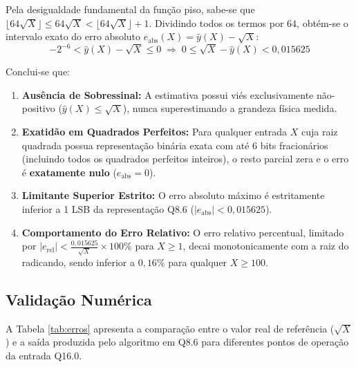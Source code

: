 \documentclass[conference]{IEEEtran}
\begin{document}
Pela desigualdade fundamental da função piso, sabe-se que $\lfloor 64\sqrt{X} \rfloor \le 64\sqrt{X} < \lfloor 64\sqrt{X} \rfloor + 1$. Dividindo todos os termos por $64$, obtém-se o intervalo exato do erro absoluto $e_{\text{abs}}(X) = \hat{y}(X) - \sqrt{X}$:
\begin{equation}
	-2^{-6} < \hat{y}(X) - \sqrt{X} \le 0 \;\Rightarrow\; 0 \le \sqrt{X} - \hat{y}(X) < 0{,}015625
	\label{eq:cota_erro}
\end{equation}

Conclui-se que:
\begin{enumerate}
	\item \textbf{Ausência de Sobressinal:} A estimativa possui viés exclusivamente não-positivo ($\hat{y}(X) \le \sqrt{X}$), nunca superestimando a grandeza física medida.
	\item \textbf{Exatidão em Quadrados Perfeitos:} Para qualquer entrada $X$ cuja raiz quadrada possua representação binária exata com até 6 bits fracionários (incluindo todos os quadrados perfeitos inteiros), o resto parcial zera e o erro é \textbf{exatamente nulo} ($e_{\text{abs}} = 0$).
	\item \textbf{Limitante Superior Estrito:} O erro absoluto máximo é estritamente inferior a 1 LSB da representação Q8.6 ($|e_{\text{abs}}| < 0{,}015625$).
	\item \textbf{Comportamento do Erro Relativo:} O erro relativo percentual, limitado por $|e_{\text{rel}}| < \frac{0{,}015625}{\sqrt{X}} \times 100\%$ para $X \ge 1$, decai monotonicamente com a raiz do radicando, sendo inferior a $0{,}16\%$ para qualquer $X \ge 100$.
\end{enumerate}

\subsection{Validação Numérica}
A Tabela \ref{tab:erros} apresenta a comparação entre o valor real de referência ($\sqrt{X}$) e a saída produzida pelo algoritmo em Q8.6 para diferentes pontos de operação da entrada Q16.0.
\end{document}
